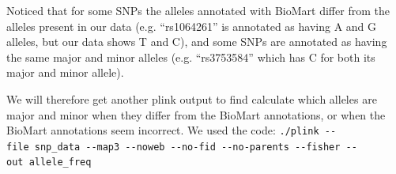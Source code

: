 \documentclass[]{article}
\newenvironment{Shaded}{\begin{snugshade}}{\end{snugshade}}
\newcommand{\KeywordTok}[1]{\textcolor[rgb]{0.13,0.29,0.53}{\textbf{#1}}}
\newcommand{\DataTypeTok}[1]{\textcolor[rgb]{0.13,0.29,0.53}{#1}}
\newcommand{\DecValTok}[1]{\textcolor[rgb]{0.00,0.00,0.81}{#1}}
\newcommand{\StringTok}[1]{\textcolor[rgb]{0.31,0.60,0.02}{#1}}
\newcommand{\CommentTok}[1]{\textcolor[rgb]{0.56,0.35,0.01}{\textit{#1}}}
\newcommand{\ControlFlowTok}[1]{\textcolor[rgb]{0.13,0.29,0.53}{\textbf{#1}}}
\newcommand{\OperatorTok}[1]{\textcolor[rgb]{0.81,0.36,0.00}{\textbf{#1}}}
\newcommand{\NormalTok}[1]{#1}
\begin{document}
\begin{Shaded}
\end{Shaded}

Noticed that for some SNPs the alleles annotated with BioMart differ
from the alleles present in our data (e.g. ``rs1064261'' is annotated as
having A and G alleles, but our data shows T and C), and some SNPs are
annotated as having the same major and minor alleles (e.g. ``rs3753584''
which has C for both its major and minor allele).

We will therefore get another plink output to find calculate which
alleles are major and minor when they differ from the BioMart
annotations, or when the BioMart annotations seem incorrect. We used the
code:
\texttt{./plink\ -\/-file\ snp\_data\ -\/-map3\ -\/-noweb\ -\/-no-fid\ -\/-no-parents\ -\/-fisher\ -\/-out\ allele\_freq}
\end{document}
